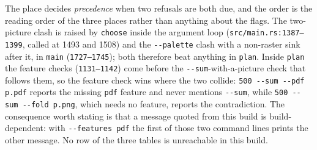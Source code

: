 \documentclass[11pt,a4paper]{article}
\newcommand{\flag}[1]{\texttt{-{}-#1}}
\begin{document}
The place decides \emph{precedence} when two refusals are both due, and the
order is the reading order of the three places rather than anything about the
flags. The two-picture clash is raised by \texttt{choose} inside the argument
loop (\texttt{src/main.rs:1387--1399}, called at 1493 and 1508) and the
\flag{palette} clash with a non-raster sink after it, in \texttt{main}
(\texttt{1727--1745}); both therefore beat anything in \texttt{plan}. Inside
\texttt{plan} the feature checks (\texttt{1131--1142}) come before the
\flag{sum}-with-a-picture check that follows them, so the feature check wins
where the two collide: \texttt{500 -{}-sum -{}-pdf p.pdf} reports the missing
\texttt{pdf} feature and never mentions \flag{sum}, while
\texttt{500 -{}-sum -{}-fold p.png}, which needs no feature, reports the
contradiction. The consequence worth stating is that a message quoted from this
build is build-dependent: with \texttt{-{}-features pdf} the first of those two
command lines prints the other message. No row of the three tables is
unreachable in this build.
\end{document}
